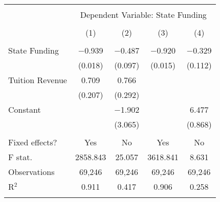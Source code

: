 
\begin{tabular}{@{\extracolsep{5pt}}lcccc} 
\\[-1.8ex]\hline 
\hline \\[-1.8ex] 
 & \multicolumn{4}{c}{Dependent Variable: State Funding} \\ 
\cline{2-5} 
\\[-1.8ex] & (1) & (2) & (3) & (4)\\ 
\hline \\[-1.8ex] 
  State Funding & $-$0.939 & $-$0.487 & $-$0.920 & $-$0.329 \\ 
  & (0.018) & (0.097) & (0.015) & (0.112) \\ 
  Tuition Revenue & 0.709 & 0.766 &  &  \\ 
  & (0.207) & (0.292) &  &  \\ 
  Constant &  & $-$1.902 &  & 6.477 \\ 
  &  & (3.065) &  & (0.868) \\ 
 \hline \\[-1.8ex] 
Fixed effects? & Yes & No & Yes & No \\ 
F stat. & 2858.843 & 25.057 & 3618.841 & 8.631 \\ 
Observations & 69,246 & 69,246 & 69,246 & 69,246 \\ 
R$^{2}$ & 0.911 & 0.417 & 0.906 & 0.258 \\ 
\hline 
\hline \\[-1.8ex] 
\end{tabular} 
